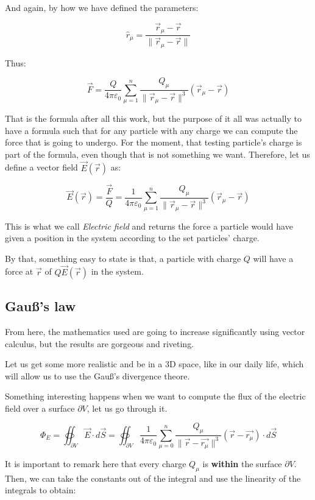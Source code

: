 \documentclass[12pt]{article}
\begin{document}
	And again, by how we have defined the parameters:
	
	\[
		\hat{r}_\mu = \frac{\vec{r}_\mu - \vec{r}}{\|\vec{r}_\mu - \vec{r}\|}
	\]
	
	Thus:
	
	\[
		\vec{F}
		= \frac{Q}{4 \pi \varepsilon_0} \sum_{\mu = 1}^n \frac{Q_\mu}{\|\vec{r}_\mu - \vec{r}\|^3} (\vec{r}_\mu - \vec{r})
	\]
	
	That is the formula after all this work, but the purpose of it all was actually to have a formula such that for any particle with any charge we can compute the force that is going to undergo. For the moment, that testing particle's charge is part of the formula, even though that is not something we want. Therefore, let us define a vector field $\vec{E}(\vec{r})$ as:
	
	\[
		\vec{E}(\vec{r}) = \frac{\vec{F}}{Q} = \frac{1}{4 \pi \varepsilon_0} \sum_{\mu = 1}^n \frac{Q_\mu}{\|\vec{r}_\mu - \vec{r}\|^3} (\vec{r}_\mu - \vec{r})
	\]
	
	This is what we call \emph{Electric field} and returns the force a particle would have given a position in the system according to the set particles' charge.
	
	By that, something easy to state is that, a particle with charge $Q$ will have a force at $\vec{r}$ of $Q\vec{E}(\vec{r})$ in the system.
	
	\subsection{Gauß's law}
	
	From here, the mathematics used are going to increase significantly using vector calculus, but the results are gorgeous and riveting.
	
	Let us get some more realistic and be in a 3D space, like in our daily life, which will allow us to use the Gauß's divergence theore.
	
	Something interesting happens when we want to compute the flux of the electric field over a surface $\partial V$, let us go through it.
	
	\[
		\Phi_E = \oiint_{\partial V} \vec{E} \cdot d\vec{S}
		= \oiint_{\partial V} \frac{1}{4 \pi \varepsilon_0} \sum_{\mu = 0}^{n} \frac{Q_\mu}{\|\vec{r}-\vec{r_\mu}\|^3}(\vec{r} - \vec{r_\mu}) \cdot d\vec{S}
	\]
	
	It is important to remark here that every charge $Q_\mu$ is \textbf{within} the surface $\partial V$.
	Then, we can take the constants out of the integral and use the linearity of the integrals to obtain:
	
\end{document}
